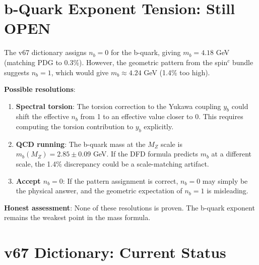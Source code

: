 \documentclass[11pt,a4paper]{article}
\begin{document}
\section{b-Quark Exponent Tension: Still OPEN}

\begin{tcolorbox}[colback=red!5!white, colframe=red!60!black,
  title={OPEN TENSION: $n_b = 0$ (best fit) vs.\ $n_b = 1$ (geometric)}]

The v67 dictionary assigns $n_b = 0$ for the b-quark, giving $m_b = 4.18$ GeV (matching PDG to 0.3\%). However, the geometric pattern from the spin$^c$ bundle suggests $n_b = 1$, which would give $m_b \approx 4.24$ GeV (1.4\% too high).

\textbf{Possible resolutions}:
\begin{enumerate}
\item \textbf{Spectral torsion}: The torsion correction to the Yukawa coupling $y_b$ could shift the effective $n_b$ from 1 to an effective value closer to 0. This requires computing the torsion contribution to $y_b$ explicitly.
\item \textbf{QCD running}: The b-quark mass at the $M_Z$ scale is $m_b(M_Z) = 2.85 \pm 0.09$ GeV. If the DFD formula predicts $m_b$ at a different scale, the 1.4\% discrepancy could be a scale-matching artifact.
\item \textbf{Accept $n_b = 0$}: If the pattern assignment is correct, $n_b = 0$ may simply be the physical answer, and the geometric expectation of $n_b = 1$ is misleading.
\end{enumerate}

\textbf{Honest assessment}: None of these resolutions is proven. The b-quark exponent remains the weakest point in the mass formula.
\end{tcolorbox}

\section{v67 Dictionary: Current Status}
\end{document}
